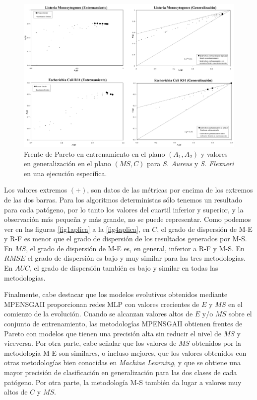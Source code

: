 \begin{landscape}
\begin{figure}[!htb]
\centering
	\includegraphics[keepaspectratio,width=17cm]{figuras/frentes_ASC09_tanda1.jpg}
		\caption{Frente de Pareto en entrenamiento en el plano $(A_{1},A_{2})$ y
valores en generalización en el plano $(MS,C)$ para \textit{S. Aureus} y \textit{S.
Flexneri} en una ejecución específica.}
	\label{fig2frentes}
\end{figure}
\end{landscape}

Los valores extremos $(+)$, son datos de
las métricas por encima de los extremos de las dos barras. Para los algoritmos
deterministas sólo tenemos un resultado para cada patógeno, por lo tanto los
valores del cuartil inferior y superior, y la observación más pequeña y más grande, no se
puede representar. Como podemos ver en las figuras \ref{fig1aplica} a la \ref{fig4aplica}, en $C$,
el
grado de dispersión de M-E y R-F es menor que el grado de dispersión de los resultados generados por
M-S. En $MS$, el grado de dispersión de M-E es, en general, inferior a R-F y M-S. En $RMSE$ el
grado de dispersión es bajo y muy similar para las tres metodologías. En $AUC$, el grado de
dispersión también es bajo y similar en todas las metodologías.

Finalmente, cabe destacar que los modelos evolutivos obtenidos mediante MPENSGAII proporcionan
redes MLP con valores crecientes de $E$ y $MS$ en el comienzo de la evolución. Cuando se
alcanzan valores altos de $E$ y/o $MS$ sobre el conjunto de entrenamiento, las metodologías
MPENSGAII obtienen frentes de Pareto con modelos que tienen una precisión alta sin reducir el nivel
de $MS$ y viceversa. Por otra parte, cabe señalar que los valores de $MS$ obtenidos por la
metodología M-E son similares, o incluso mejores, que los valores obtenidos con otras metodologías
bien
conocidas en \textit{Machine Learning}, y que se obtiene una mayor precisión de clasificación en
generalización para las dos clases de cada patógeno. Por otra parte, la metodología M-S también da
lugar a valores muy altos de $C$ y $MS$.

